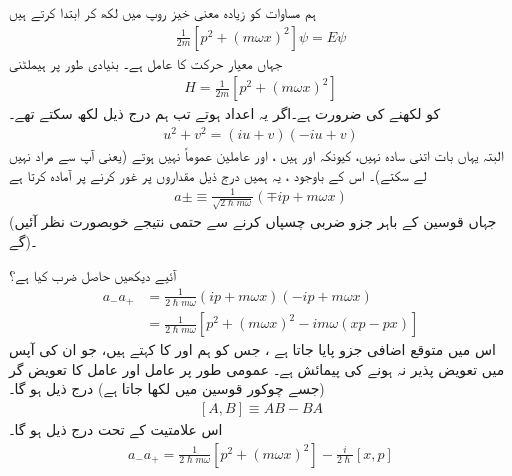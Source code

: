 
ہم مساوات  کو زیادہ معنی خیز روپ میں لکھ کر ابتدا کرتے ہیں
\begin{align}
\frac{1}{2m}[p^{2}+(m\omega x)^{2}]\psi=E\psi
\end{align}
جہاں   معیار حرکت کا عامل ہے۔ بنیادی طور پر ہیملٹنی
\begin{align}
H=\frac{1}{2m}[p^{2}+(m\omega x)^{2}]
\end{align}
کو  لکھنے کی ضرورت ہے۔اگر یہ  اعداد ہوتے تب ہم درج ذیل لکھ سکتے تھے۔
\begin{align*}
u^{2}+v^{2}=(iu+v)(-iu+v)
\end{align*}
البتہ یہاں بات اتنی سادہ نہیں،  کیونکہ  اور   ہیں ، اور عاملین عموماً  نہیں ہوتے  (یعنی آپ  سے مراد  نہیں لے سکتے)۔ اس کے باوجود ، یہ ہمیں درج ذیل مقداروں پر غور کرنے پر آمادہ کرتا ہے
\begin{align}\label{مساوات_شروڈنگر_تعریفات_سیڑھی}
a\pm\equiv \frac{1}{\sqrt{2\hslash m\omega}}(\mp ip+m\omega x)
\end{align}
(جہاں قوسین کے باہر جزو ضربی  چسپاں کرنے  سے حتمی نتیجے  خوبصورت نظر آئیں گے)۔

آئیے دیکھیں حاصل ضرب  کیا ہے؟
\begin{align*}
a_{-}a_{+}&=\frac{1}{2\hslash m\omega}(ip+m\omega x)(-ip+m\omega x)\\
&=\frac{1}{2\hslash m\omega}[p^{2}+(m\omega x)^{2}-im\omega(xp-px)]
\end{align*}
اس میں متوقع اضافی جزو   پایا جاتا ہے ، جس کو ہم  اور  کا   کہتے ہیں،  جو  ان کی آپس میں تعویض پذیر  نہ ہونے کی پیمائش ہے۔ عمومی طور پر عامل  اور عامل  کا  تعویض گر (جسے چوکور قوسین میں لکھا  جاتا ہے)  درج ذیل ہو گا۔
\begin{align}\label{مساوات_غیر_تابع_شروڈنگر_تبادل_کار}
[A,B]\equiv AB-BA
\end{align}
اس علامتیت کے تحت درج ذیل ہو گا۔
\begin{align}\label{مساوات_شروڈنگر_سیڑھی_حاصل_ضرب}
a_{-}a_{+}=\frac{1}{2\hslash m\omega}[p^{2}+(m\omega x)^{2}]-\frac{i}{2\hslash}[x,p]
\end{align}


